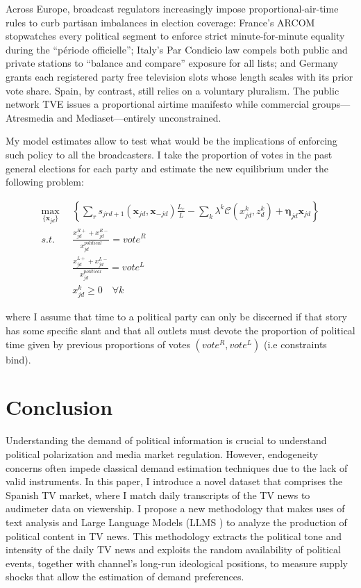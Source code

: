 \documentclass[12pt]{article}
\begin{document}
Across Europe, broadcast regulators increasingly impose proportional-air-time rules to curb partisan imbalances in election coverage: France’s ARCOM stopwatches every political segment to enforce strict minute-for-minute equality during the “période officielle”; Italy’s Par Condicio law compels both public and private stations to “balance and compare” exposure for all lists; and Germany grants each registered party free television slots whose length scales with its prior vote share. Spain, by contrast, still relies on a voluntary pluralism. The public network TVE issues a proportional airtime manifesto while commercial groups—Atresmedia and Mediaset—entirely unconstrained. 

My model estimates allow to test what would be the implications of enforcing such policy to all the broadcasters.  I take the proportion of votes in the past general elections for each party and estimate the new equilibrium under the following problem: 



\begin{equation}\label{eq:payoffs2}
	\begin{aligned}
		\max_{\{\mathbf{x}_{jd}\}}   & \left\{   \sum_{r}s_{jrd+1}(\bm{x}_{jd}, \bm{x}_{-jd})\frac{L_r}{L} - \sum_k {\lambda^k}\mathcal{C}({x}^k_{jd}, {z}^k_d)+ \bm{\eta}_{jd}\bm{x}_{jd} \right\}\\
		s.t.   \quad &   \frac{x_{jd}^{R+} + x_{jd}^{R-} }{x_{jd}^{political}}=vote^R\\
		&  \frac{x_{jd}^{L+} + x_{jd}^{L-} }{x_{jd}^{political}}= vote^L\\
		& x_{jd}^k \geq 0 \quad \forall k
	\end{aligned}
\end{equation} 


where I assume that time to a political party can only be discerned if that story has some specific slant and that all outlets must devote the proportion of political time given by previous proportions of votes $(vote^R, vote^L)$ (i.e constraints bind). 


\clearpage

	
	\section{Conclusion}
	
	Understanding the demand of political information is crucial to understand political polarization and media market regulation. However, endogeneity concerns often  impede classical demand estimation techniques due to the lack of valid instruments. In this paper,  I introduce a novel dataset that comprises the Spanish TV market, where I match daily transcripts of the TV news to audimeter data on viewership. I propose a new methodology that makes uses of text analysis and Large Language Models (LLMS ) to analyze the production of political content in TV news. This methodology extracts the political tone and intensity of the daily TV news and  exploits the random availability of political events, together with channel's long-run ideological positions, to measure supply shocks that allow the estimation of  demand preferences.
	
\end{document}
